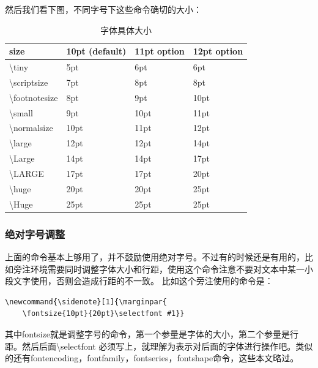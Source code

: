 \documentclass[12pt,oneside]{book}
\begin{document}
\begin{common-format}
然后我们看下图，不同字号下这些命令确切的大小：

\begin{table}[H]
\centering
\begin{tabular}{@{}llll@{}}
\toprule 
size          & 10pt (default) & 11pt option & 12pt option \\ \midrule
\textbackslash tiny         & 5pt            & 6pt         & 6pt         \\
\textbackslash scriptsize   & 7pt            & 8pt         & 8pt         \\
\textbackslash footnotesize & 8pt            & 9pt         & 10pt        \\
\textbackslash small        & 9pt            & 10pt        & 11pt        \\
\textbackslash normalsize   & 10pt           & 11pt        & 12pt        \\
\textbackslash large        & 12pt           & 12pt        & 14pt        \\
\textbackslash Large        & 14pt           & 14pt        & 17pt        \\
\textbackslash LARGE        & 17pt           & 17pt        & 20pt        \\
\textbackslash huge         & 20pt           & 20pt        & 25pt        \\
\textbackslash Huge         & 25pt           & 25pt        & 25pt        \\ \bottomrule
\end{tabular}
\label{tab:字体具体大小}
\caption{字体具体大小}
\end{table}


\subsubsection{绝对字号调整}
上面的命令基本上够用了，并不鼓励使用绝对字号。不过有的时候还是有用的，比如旁注环境需要同时调整字体大小和行距，使用这个命令注意不要对文本中某一小段文字使用，否则会造成行距的不一致。
比如这个旁注使用的命令是：
\begin{Verbatim}
\newcommand{\sidenote}[1]{\marginpar{  
 	\fontsize{10pt}{20pt}\selectfont #1}}
\end{Verbatim}
其中fontsize就是调整字号的命令，第一个参量是字体的大小，第二个参量是行距。然后后面\textbackslash selectfont 必须写上，就理解为表示对后面的字体进行操作吧。类似的还有fontencoding，fontfamily，fontseries，fontshape命令，这些本文略过。



\end{common-format}
\end{document}
